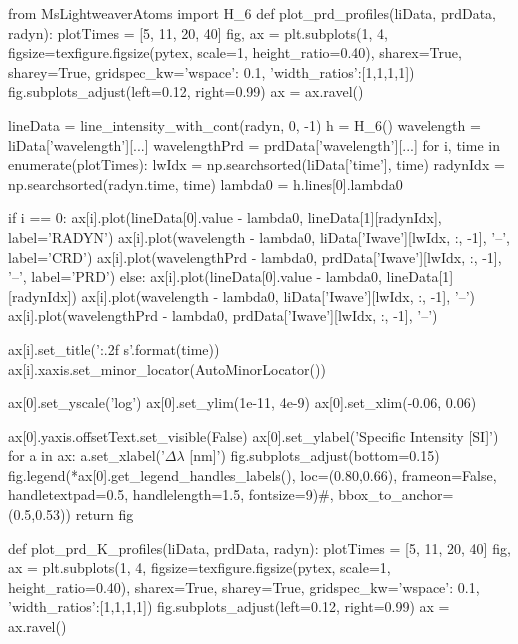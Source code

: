 \begin{pycode}[TimeDepRT]
from MsLightweaverAtoms import H_6
def plot_prd_profiles(liData, prdData, radyn):
    plotTimes = [5, 11, 20, 40]
    fig, ax = plt.subplots(1, 4, figsize=texfigure.figsize(pytex, scale=1, height_ratio=0.40),
                           sharex=True, sharey=True,
                           gridspec_kw={'wspace': 0.1, 'width_ratios':[1,1,1,1]})
    fig.subplots_adjust(left=0.12, right=0.99)
    ax = ax.ravel()

    lineData = line_intensity_with_cont(radyn, 0, -1)
    h = H_6()
    wavelength = liData['wavelength'][...]
    wavelengthPrd = prdData['wavelength'][...]
    for i, time in enumerate(plotTimes):
        lwIdx = np.searchsorted(liData['time'], time)
        radynIdx = np.searchsorted(radyn.time, time)
        lambda0 = h.lines[0].lambda0

        if i == 0:
            ax[i].plot(lineData[0].value - lambda0, lineData[1][radynIdx], label='RADYN')
            ax[i].plot(wavelength - lambda0, liData['Iwave'][lwIdx, :, -1], '--', label='CRD')
            ax[i].plot(wavelengthPrd - lambda0, prdData['Iwave'][lwIdx, :, -1], '--', label='PRD')
        else:
            ax[i].plot(lineData[0].value - lambda0, lineData[1][radynIdx])
            ax[i].plot(wavelength - lambda0, liData['Iwave'][lwIdx, :, -1], '--')
            ax[i].plot(wavelengthPrd - lambda0, prdData['Iwave'][lwIdx, :, -1], '--')

        ax[i].set_title('{:.2f} s'.format(time))
        ax[i].xaxis.set_minor_locator(AutoMinorLocator())

    ax[0].set_yscale('log')
    ax[0].set_ylim(1e-11, 4e-9)
    ax[0].set_xlim(-0.06, 0.06)

    ax[0].yaxis.offsetText.set_visible(False)
    ax[0].set_ylabel('Specific Intensity [SI]')
    for a in ax:
        a.set_xlabel('$\Delta\lambda$ [nm]')
    fig.subplots_adjust(bottom=0.15)
    fig.legend(*ax[0].get_legend_handles_labels(), loc=(0.80,0.66), frameon=False,
               handletextpad=0.5, handlelength=1.5, fontsize=9)#, bbox_to_anchor=(0.5,0.53))
    return fig

def plot_prd_K_profiles(liData, prdData, radyn):
    plotTimes = [5, 11, 20, 40]
    fig, ax = plt.subplots(1, 4, figsize=texfigure.figsize(pytex, scale=1, height_ratio=0.40),
                           sharex=True, sharey=True,
                           gridspec_kw={'wspace': 0.1, 'width_ratios':[1,1,1,1]})
    fig.subplots_adjust(left=0.12, right=0.99)
    ax = ax.ravel()


\end{pycode}
